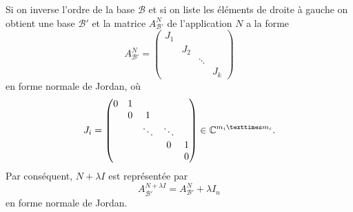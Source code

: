 \begin{remark}
  \label{rem:4}
  Si on inverse l'ordre de la base $ℬ$ et si on liste les éléments de droite à gauche on obtient une base $ℬ'$ et la matrice $A_{ℬ'}^{N }$ de l'application $N$  a la forme 
  \begin{displaymath}
    A_{ℬ'}^N =
    \begin{pmatrix}
      J_1 \\
      & J_2 \\
      & & \ddots \\
      & & & J_k
    \end{pmatrix}
  \end{displaymath}
en forme normale de Jordan, où 
\begin{displaymath}
  J_i =
  \begin{pmatrix}
    0 & 1 \\
    &  0 & 1 \\
    &    & \ddots & \ddots \\
    &    &        & 0 & 1 \\
    & & & & 0
  \end{pmatrix} \in \C^{m_i × m_i}. 
\end{displaymath}
Par conséquent, $N+ λI$ est représentée par 
\begin{displaymath}
 A_{ℬ'}^{N + λI} =    A_{ℬ'}^N + λ I_n
\end{displaymath}
en forme normale de Jordan. 
\end{remark}


